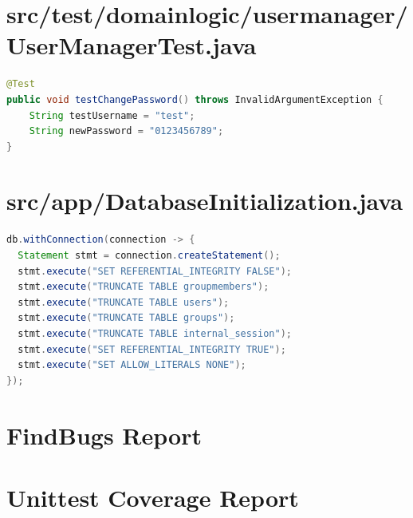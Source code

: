 \documentclass[12pt,DIV14,BCOR10mm,a4paper,parskip=half-,headsepline,headinclude,english,ngerman,bibliography=totocnumbered]{scrreprt}
\begin{document}

\begin{appendices}

\chapter{src/test/domainlogic/\allowbreak usermanager/UserManagerTest.java}
\begin{lstlisting}[language=Java,caption=Hardkodiertes Passwort in einem Test aus der Klasse \texttt{UserManagerTest},label={lst:staticanalysis-hardcoded-pw}]
@Test
public void testChangePassword() throws InvalidArgumentException {
    String testUsername = "test";
    String newPassword = "0123456789";
}
\end{lstlisting}

\chapter{src/app/DatabaseInitialization.java}
\begin{lstlisting}[language=Java,caption=Von SecureAssist gefundenes False Positive Beispiel für Query Injections,label={lst:staticanalysis-query-injection}]
db.withConnection(connection -> {
  Statement stmt = connection.createStatement();
  stmt.execute("SET REFERENTIAL_INTEGRITY FALSE");
  stmt.execute("TRUNCATE TABLE groupmembers");
  stmt.execute("TRUNCATE TABLE users");
  stmt.execute("TRUNCATE TABLE groups");
  stmt.execute("TRUNCATE TABLE internal_session");
  stmt.execute("SET REFERENTIAL_INTEGRITY TRUE");
  stmt.execute("SET ALLOW_LITERALS NONE");
});
\end{lstlisting}

\chapter{FindBugs Report}
\label{staticanalysis-find-bugs}


\chapter{Unittest Coverage Report}
\label{unitcover}


\end{appendices}
\end{document}
